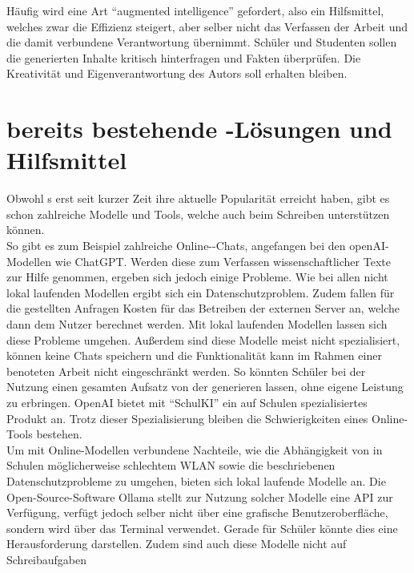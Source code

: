 \documentclass[../main.tex]{subfiles}
\begin{document}
Häufig wird eine Art "`augmented intelligence"' gefordert, also ein Hilfsmittel, welches zwar die Effizienz steigert, aber selber nicht das Verfassen der 
Arbeit und die damit verbundene Verantwortung übernimmt. Schüler und Studenten sollen die generierten Inhalte kritisch hinterfragen und Fakten überprüfen. Die Kreativität und 
Eigenverantwortung des Autors soll erhalten bleiben.\cite{BucherSchwarzerHolzwweißig,humanWritingToAi,teachers,ZukunftWissenschaftlichesPublizieren} 

\section{bereits bestehende -Lösungen und Hilfsmittel}
\label{sec:bereitsBestehendeLoesungen}

Obwohl s erst seit kurzer Zeit ihre aktuelle Popularität erreicht haben, gibt es schon zahlreiche Modelle und Tools, welche auch beim Schreiben unterstützen können. \\
So gibt es zum Beispiel zahlreiche Online--Chats, angefangen bei den openAI-Modellen wie ChatGPT. Werden diese zum Verfassen wissenschaftlicher Texte zur Hilfe genommen, ergeben 
sich jedoch einige Probleme. Wie bei allen nicht lokal laufenden Modellen ergibt sich ein Datenschutzproblem. Zudem fallen für die gestellten Anfragen Kosten für das Betreiben der 
externen Server an, welche dann dem Nutzer berechnet werden. Mit lokal laufenden Modellen lassen sich diese Probleme umgehen. Außerdem sind diese Modelle meist nicht spezialisiert, 
können keine Chats speichern und die Funktionalität kann im Rahmen einer benoteten Arbeit nicht eingeschränkt werden. So könnten Schüler bei der Nutzung einen gesamten Aufsatz von 
der  generieren lassen, ohne eigene Leistung zu erbringen. OpenAI bietet mit "`SchulKI"' ein auf Schulen spezialisiertes Produkt an. Trotz dieser Spezialisierung bleiben die 
Schwierigkeiten eines Online-Tools bestehen.\cite{schulki}\\ 
Um mit Online-Modellen verbundene Nachteile, wie die Abhängigkeit von in Schulen möglicherweise schlechtem WLAN sowie die beschriebenen Datenschutzprobleme zu umgehen, bieten sich 
lokal laufende Modelle an. Die Open-Source-Software Ollama stellt zur Nutzung solcher Modelle eine API zur Verfügung, verfügt jedoch selber nicht über eine grafische 
Benutzeroberfläche, sondern wird über das Terminal verwendet. Gerade für Schüler könnte dies eine Herausforderung darstellen. Zudem sind auch diese Modelle nicht auf Schreibaufgaben 
\end{document}
